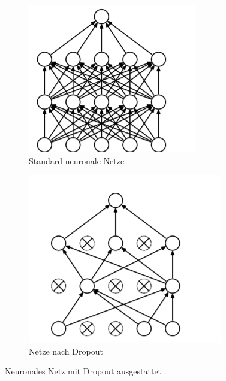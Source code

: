 \documentclass[12pt,a4paper]{scrartcl}
\numberwithin{equation}{section}
\begin{document}
\begin{figure}[h]
	\begin{subfigure}{.5\textwidth}
		\centering
		\includegraphics[scale=2, width=.8\linewidth, height=\linewidth]{dropout1.png}
		\caption{Standard neuronale Netze}
		\label{fig:dropout1}
	\end{subfigure}%
	\begin{subfigure}{.5\textwidth}
		\centering
		\includegraphics[width=.8\linewidth, height=\linewidth, scale=2]{dropout2.png}
		\caption{Netze nach Dropout}
		\label{fig:dropout2}
	\end{subfigure}
	\caption{Neuronales Netz mit Dropout ausgestattet \cite{3}.}
	\label{fig:Dropout}
\end{figure}
\end{document}

